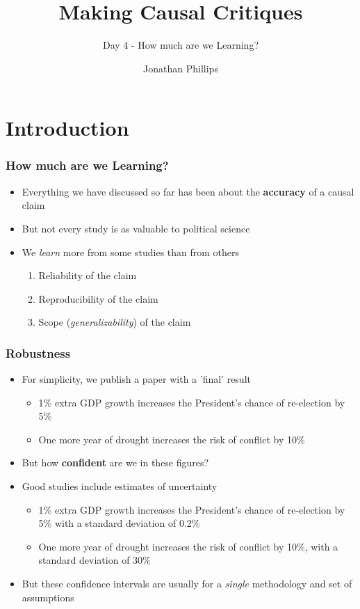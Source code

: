 \documentclass[xcolor=x11names,compress]{beamer}\usepackage[]{graphicx}\usepackage[]{color}
\title{Making Causal Critiques}
\subtitle{Day 4 - How much are we Learning?}
\author{Jonathan Phillips}
\renewcommand{\(}{\begin{columns}}
\renewcommand{\)}{\end{columns}}
\newcommand{\<}[1]{\begin{column}{#1}}
\renewcommand{\>}{\end{column}}
\begin{document}
\frame{\titlepage}

\section{Introduction}

\begin{frame}
\frametitle{How much are we Learning?}
\begin{itemize}
\item Everything we have discussed so far has been about the \textbf{accuracy} of a causal claim
\item But not every study is as valuable to political science
\item We \textit{learn} more from some studies than from others
\begin{enumerate}
\item Reliability of the claim
\item Reproducibility of the claim
\item Scope (\textit{generalizability}) of the claim
\end{enumerate}
\end{itemize}
\end{frame}

\begin{frame}
\frametitle{Robustness}
\begin{itemize}
\item For simplicity, we publish a paper with a 'final' result
\begin{itemize}
\item 1\% extra GDP growth increases the President's chance of re-election by 5\%
\item One more year of drought increases the risk of conflict by 10\%
\end{itemize}
\item But how \textbf{confident} are we in these figures?
\item Good studies include estimates of uncertainty
\begin{itemize}
\item 1\% extra GDP growth increases the President's chance of re-election by 5\% with a standard deviation of 0.2\%
\item One more year of drought increases the risk of conflict by 10\%, with a standard deviation of 30\%
\end{itemize}
\item But these confidence intervals are usually for a \textit{single} methodology and set of assumptions
\end{itemize}
\end{frame}
\end{document}
